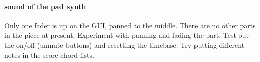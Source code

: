 \paragraph{sound of the pad synth}
Only one fader is up on the GUI, panned to the middle.
There are no other parts in the piece at present.
Experiment with panning and fading the part. Test out the
on/off (unmute buttons) and resetting the timebase. Try
putting different notes in the score chord lists.